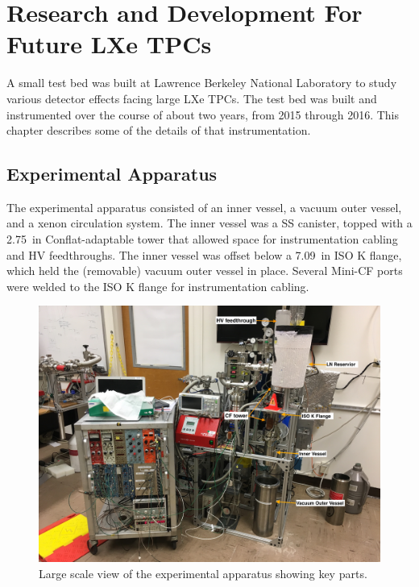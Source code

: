 \chapter{Research and Development For Future LXe TPCs}

\label{ch:RandD} %

A small test bed was built at Lawrence Berkeley National Laboratory to study various detector effects facing large \ac{LXe} \ac{TPC}s. The test bed was built and instrumented over the course of about two years, from 2015 through 2016. This chapter describes some of the details of that instrumentation.

\section{Experimental Apparatus}
The experimental apparatus consisted of an inner vessel, a vacuum outer vessel, and a xenon circulation system. The inner vessel was a \ac{SS} canister, topped with a 2.75~in Conflat-adaptable tower that allowed space for instrumentation cabling and \ac{HV} feedthroughs. The inner vessel was offset below a 7.09~in ISO K flange, which held the (removable) vacuum outer vessel in place. Several Mini-CF ports were welded to the ISO K flange for instrumentation cabling.

\begin{figure}[htbp]
\begin{center}
\includegraphics[width=\textwidth]{figures/testbed/apparatus.jpg}
\caption{Large scale view of the experimental apparatus showing key parts.}
\label{fig:apparatus}
\end{center}
\end{figure}


